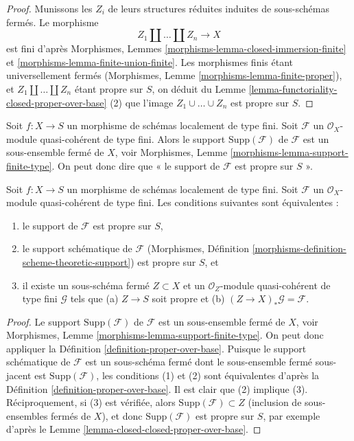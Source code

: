 \begin{proof}
Munissons les $Z_i$ de leurs structures réduites induites de sous-schémas fermés.
Le morphisme
$$
Z_1 \amalg \ldots \amalg Z_n \longrightarrow X
$$
est fini d'après Morphismes, Lemmes
\ref{morphisms-lemma-closed-immersion-finite} et
\ref{morphisms-lemma-finite-union-finite}.
Les morphismes finis étant universellement fermés
(Morphismes, Lemme \ref{morphisms-lemma-finite-proper}),
et $Z_1 \amalg \ldots \amalg Z_n$ étant propre sur $S$,
on déduit du
Lemme \ref{lemma-functoriality-closed-proper-over-base} (2)
que l'image $Z_1 \cup \ldots \cup Z_n$ est propre sur $S$.
\end{proof}

\noindent
Soit $f : X \to S$ un morphisme de schémas localement
de type fini. Soit $\mathcal{F}$ un
$\mathcal{O}_X$-module quasi-cohérent de type fini. Alors le support $\text{Supp}(\mathcal{F})$
de $\mathcal{F}$ est un sous-ensemble fermé de $X$, voir
Morphismes, Lemme \ref{morphisms-lemma-support-finite-type}.
On peut donc dire que
« le support de $\mathcal{F}$ est propre sur $S$ ».

\begin{lemma}
\label{lemma-module-support-proper-over-base}
Soit $f : X \to S$ un morphisme de schémas localement
de type fini. Soit $\mathcal{F}$ un
$\mathcal{O}_X$-module quasi-cohérent de type fini. Les conditions suivantes sont équivalentes :
\begin{enumerate}
\item le support de $\mathcal{F}$ est propre sur $S$,
\item le support schématique de $\mathcal{F}$
(Morphismes, Définition \ref{morphisms-definition-scheme-theoretic-support})
est propre sur $S$, et
\item il existe un sous-schéma fermé $Z \subset X$ et
un $\mathcal{O}_Z$-module quasi-cohérent de type fini
$\mathcal{G}$ tels que (a) $Z \to S$ soit propre et (b)
$(Z \to X)_*\mathcal{G} = \mathcal{F}$.
\end{enumerate}
\end{lemma}

\begin{proof}
Le support $\text{Supp}(\mathcal{F})$ de $\mathcal{F}$ est un sous-ensemble fermé
de $X$, voir Morphismes, Lemme \ref{morphisms-lemma-support-finite-type}.
On peut donc appliquer la Définition \ref{definition-proper-over-base}.
Puisque le support schématique de $\mathcal{F}$ est un sous-schéma
fermé dont le sous-ensemble fermé sous-jacent est $\text{Supp}(\mathcal{F})$,
les conditions (1) et (2) sont équivalentes d'après la
Définition \ref{definition-proper-over-base}.
Il est clair que (2) implique (3).
Réciproquement, si (3) est vérifiée, alors
$\text{Supp}(\mathcal{F}) \subset Z$
(inclusion de sous-ensembles fermés de $X$),
et donc $\text{Supp}(\mathcal{F})$
est propre sur $S$, par exemple d'après le
Lemme \ref{lemma-closed-closed-proper-over-base}.
\end{proof}

